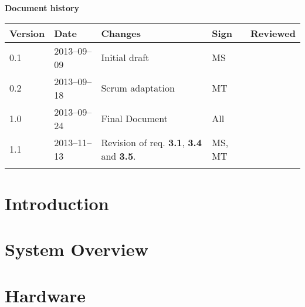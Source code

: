 \documentclass[10pt, a4paper, twoside]{article}
\numberwithin{equation}{subsection}
\numberwithin{figure}{section}
\numberwithin{table}{section}
\begin{document}



\newpage
\pagestyle{fancy}
\setcounter{page}{2} %



\newpage
\tableofcontents
\listoffigures


\newpage
\vspace*{5\baselineskip}

\begin{center}
\textbf{\LARGE Document history}

{ \footnotesize 
\begin{tabular}{|p{1cm}|p{2.0cm}|p{5cm}|p{1.5cm}|p{2cm}|}
	\hline
	\textbf{Version} & \textbf{Date} & \textbf{Changes} & \textbf{Sign} & \textbf{Reviewed} \\
	
	\hline
	0.1 & 2013--09--09 & Initial draft & MS & \\
	\hline
	0.2 & 2013--09--18 & Scrum adaptation & MT & \\
	\hline
	1.0 & 2013--09--24 & Final Document & All & \\
	\hline
	1.1 & 2013--11--13 & Revision of req. \textbf{3.1}, \textbf{3.4} and \textbf{3.5}. & MS, MT & \\
	
	\hline
	 &  &  &  &  \\
	
	\hline
\end{tabular}
}
\end{center}



%
%
\newpage
{}


\newpage
\section{Introduction}
\label{sec:introduction}


\newpage
\section{System Overview}
\label{sec:system_overview}


\newpage
\section{Hardware}
\label{sec:hardware}

\end{document}
